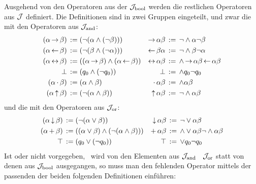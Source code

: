 Ausgehend von den Operatoren aus der  $\mathcal{J}_{\mathrm{bool}}$ werden die restlichen Operatoren aus $\mathcal{J}$ definiert. Die Definitionen sind in zwei Gruppen eingeteilt, und zwar die mit den Operatoren aus $\mathcal{J}_{\mathrm{and}}$:
\begin{align}
	(\alpha \limp \beta) &\;\defeq\; (\lnot (\alpha \land  (\lnot \beta))) &
	\limp \alpha \beta   &\;\defeq\;  \lnot    \land \alpha \lnot \beta
	\label{def:imp}
	\\
	(\alpha \lrep \beta) &\;\defeq\; (\lnot (\beta \land  (\lnot \alpha))) &
	\lrep \beta  \alpha  &\;\defeq\;  \lnot    \land \beta \lnot \alpha
	\label{def:rep}
	\\
	(\alpha\lequiv\beta) &\;\defeq\;((\alpha\limp\beta)\land(\alpha\lrep\beta))&
	\lequiv\alpha \beta  &\;\defeq\;\land \limp \alpha \beta \lrep \alpha \beta
	\label{def:equiv}
	\\
	\lfalse              &\;\defeq\; (\alvar_0 \land (\lnot \alvar_0)) &
	\lfalse              &\;\defeq\;  \land \alvar_0  \lnot \alvar_0   \label{def:false}
	\\
	(\alpha \lmult \beta)&\;\defeq\; (\alpha \land \beta)          &
	\lmult \alpha  \beta &\;\defeq\;  \land \alpha \beta        \label{def:mult}
	\\
	(\alpha \lnand \beta)&\;\defeq\; (\lnot (\alpha \land \beta )) &
	\lnand \alpha  \beta &\;\defeq\;  \lnot  \land \alpha \beta \label{def:nand}
\end{align}
und die mit den Operatoren aus $\mathcal{J}_{\mathrm{or}}$:
\begin{align}
	(\alpha \operatorname{\downarrow} \beta) &\;\operatorname{:\!\operatorname{=}}\; (\lnot (\alpha \lor \beta))   &
	\operatorname{\downarrow} \alpha  \beta  & \;\operatorname{:\!\operatorname{=}}\;  \lnot  \lor \alpha \beta \label{def:nor}
	\\
	(\alpha\operatorname{+}\beta)&\;\operatorname{:\!\operatorname{=}}\;((\alpha\lor\beta)\land(\lnot(\alpha\land\beta)))&
	\operatorname{+}\alpha \beta &\;\operatorname{:\!\operatorname{=}}\;  \land \lor\alpha\beta \lnot \land\alpha\beta
	\label{def:add}
	\\
	\top & \;\operatorname{:\!\operatorname{=}}\; (q_0 \lor (\lnot q_0)) &
	\top & \;\operatorname{:\!\operatorname{=}}\;  \lor q_0  \lnot q_0
	\label{def:true}
\end{align}
%
Ist \symqt{\lor} oder \symqt{\land} nicht vorgegeben, \textdh\ wird von den Elementen aus $\mathcal{J}_{\mathrm{and}}$ \textbzgl\ $\mathcal{J}_{\mathrm{or}}$ statt von denen aus $\mathcal{J}_{\mathrm{bool}}$ ausgegangen, so muss man den fehlenden Operator mittels der passenden der beiden folgenden Definitionen einführen:
